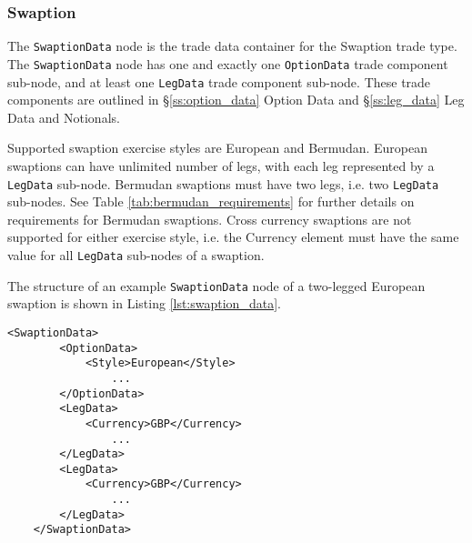 \subsubsection{Swaption}

The \lstinline!SwaptionData!  node is the trade data container for the Swaption trade type. The \lstinline!SwaptionData!  node has one and exactly one \lstinline!OptionData! trade component sub-node, and at least one \lstinline!LegData! trade component sub-node.  These trade components are outlined in \S \ref{ss:option_data} Option Data and \S \ref{ss:leg_data} Leg Data and Notionals.

Supported swaption exercise styles are European and Bermudan. European swaptions can have unlimited number of legs, with each leg represented by a \lstinline!LegData! sub-node. Bermudan swaptions must have two legs, i.e. two \lstinline!LegData! sub-nodes. See Table \ref{tab:bermudan_requirements} for further details on requirements for Bermudan swaptions. Cross currency swaptions are not supported for either exercise style, i.e. the Currency element must have the same value for all \lstinline!LegData! sub-nodes of a swaption.

The structure of an example \lstinline!SwaptionData!  node of a two-legged European swaption is shown in Listing \ref{lst:swaption_data}.  

{\footnotesize
\begin{lstlisting}[caption=SwaptionData, label=lst:swaption_data]
	<SwaptionData>
		<OptionData>
			<Style>European</Style>
				...
		</OptionData>
		<LegData>
			<Currency>GBP</Currency>
				...
		</LegData>
		<LegData>
			<Currency>GBP</Currency>
				...
		</LegData>
	</SwaptionData>
\end{lstlisting}
}

